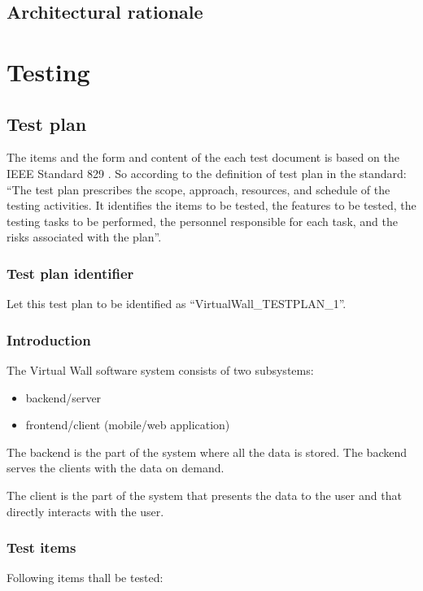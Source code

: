 \documentclass[11pt]{book}
\begin{document}
\section{Architectural rationale}


\chapter{Testing}

\section{Test plan}

The items and the form and content of the each test document is based on the IEEE Standard 829 \cite{ieee829}. So according to the definition of test plan in the standard: ``The test plan prescribes the scope, approach, resources, and schedule of the testing activities. It identifies the items to be tested, the features to be tested, the testing tasks to be performed, the personnel responsible for each task, and the risks associated with the plan''.

\subsection{Test plan identifier}
Let this test plan to be identified as ``VirtualWall\_TESTPLAN\_1''.

\subsection{Introduction}
The Virtual Wall software system consists of two subsystems:

\begin{itemize}
	\item backend/server
	\item frontend/client (mobile/web application)
\end{itemize}

The backend is the part of the system where all the data is stored. The backend serves the clients with the data on demand.

The client is the part of the system that presents the data to the user and that directly interacts with the user.

\subsection{Test items}
Following items thall be tested:
\end{document}
